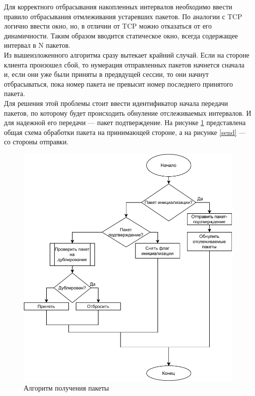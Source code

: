 \documentclass[14pt, a4paper]{extarticle}
\begin{document}
Для корректного отбрасывания накопленных интервалов необходимо ввести правило отбрасывания отмлеживания устаревших пакетов. По аналогии с TCP логично ввести окно, но, в отличии от TCP можно отказаться от его динамичности. Таким образом вводится статическое окно, всегда содержащее интервал в N пакетов. \\
\indent Из вышеизложенного алгоритма сразу вытекает крайний случай. Если на стороне клиента произошел сбой, то нумерация отправленных пакетов начнется сначала и, если они уже были приняты в предвдущей сессии, то они начнут отбрасываться, пока номер пакета не превысит номер последнего принятого пакета. \\ 
\indent Для решения этой проблемы стоит ввести идентификатор начала передачи пакетов, по которому будет происходить обнуление отслеживаемых интервалов. И для надежной его передачи --- пакет подтверждение. На рисунке \ref{catch} представлена общая схема обработки пакета на принимающей стороне, а на рисунке \ref{send} --- со стороны отправки.
\begin{figure}[H]
	\centering
	\includegraphics[scale=1]{catch.pdf}
	\caption{Алгоритм получения пакеты}
	\label{catch}
\end{figure}
\end{document}

